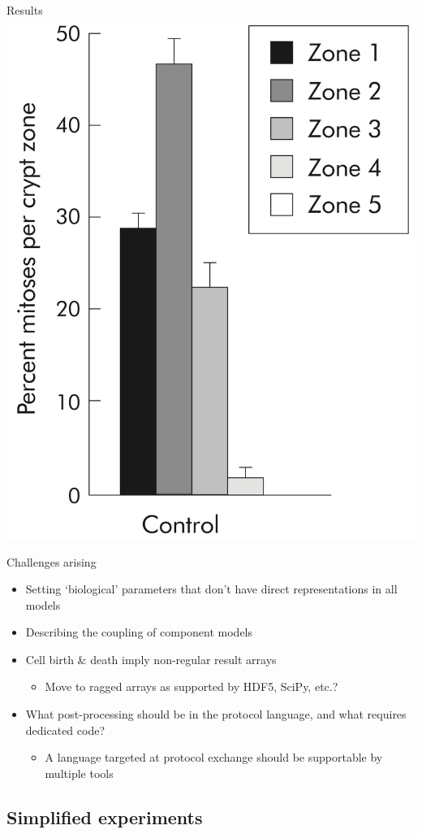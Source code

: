\documentclass[t,xcolor={usenames,dvipsnames}]{beamer}
\newcommand{\subitem}[1]{\begin{itemize}[<.->]\item #1 \end{itemize}}
\begin{document}
\begin{frame}{Results}
\includegraphics[height=.4\textheight]{WongFigure}
\end{frame}


\begin{frame}{Challenges arising}
\begin{itemize}
\item Setting `biological' parameters that don't have direct representations in all models
\item Describing the coupling of component models
\item Cell birth \& death imply non-regular result arrays
  \subitem{Move to ragged arrays as supported by HDF5, SciPy, etc.?}
\item What post-processing should be in the protocol language, and what requires dedicated code?
  \subitem{A language targeted at protocol exchange should be supportable by multiple tools}
\end{itemize}
\end{frame}

\subsection{Simplified experiments}
\end{document}
